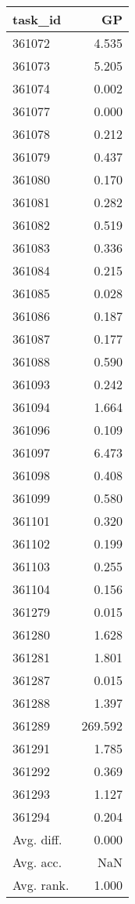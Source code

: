 \begin{tabular}{lr}
\toprule
task\_id & GP \\
\midrule
361072 & 4.535 \\
361073 & 5.205 \\
361074 & 0.002 \\
361077 & 0.000 \\
361078 & 0.212 \\
361079 & 0.437 \\
361080 & 0.170 \\
361081 & 0.282 \\
361082 & 0.519 \\
361083 & 0.336 \\
361084 & 0.215 \\
361085 & 0.028 \\
361086 & 0.187 \\
361087 & 0.177 \\
361088 & 0.590 \\
361093 & 0.242 \\
361094 & 1.664 \\
361096 & 0.109 \\
361097 & 6.473 \\
361098 & 0.408 \\
361099 & 0.580 \\
361101 & 0.320 \\
361102 & 0.199 \\
361103 & 0.255 \\
361104 & 0.156 \\
361279 & 0.015 \\
361280 & 1.628 \\
361281 & 1.801 \\
361287 & 0.015 \\
361288 & 1.397 \\
361289 & 269.592 \\
361291 & 1.785 \\
361292 & 0.369 \\
361293 & 1.127 \\
361294 & 0.204 \\
Avg. diff. & 0.000 \\
Avg. acc. & NaN \\
Avg. rank. & 1.000 \\
\bottomrule
\end{tabular}
